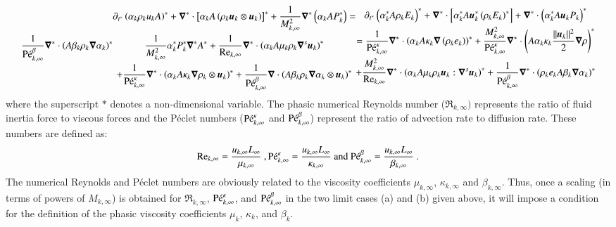 \documentclass[preprint,10pt]{elsarticle}
\begin{document}
\begin{enumerate}
\begin{subequations}
\begin{multline}
\frac{1}{\Pe_{k,\infty}^\beta} \grad^* \cdot \left( A \beta_k \rho_k \grad \alpha_k \right)^*
\end{multline}
%
\begin{multline}\label{eq:sev_equ-with-diss-terms-mom_case_one_scaled}
\partial_{t^*} \left( \alpha_k \rho_k u_k A \right)^* + \grad^* \cdot \left[ \alpha_k A \left( \rho_k \mbold u_k \otimes \mbold u_k\right)\right]^* + \frac{1}{M^2_{k,\infty}}\grad^* \left( \alpha_k A P_k^* \right) = \\
  \frac{1}{M^2_{k,\infty}} \alpha_k^* P^*_k \grad^* A^*  
+ \frac{1}{\Re_{k,\infty}}\grad^* \cdot \left( \alpha_k A \mu_k \rho_k \grad^s \mbold u_k \right)^* \\ 
+ \frac{1}{\Pe_{k,\infty}^\kappa} \grad^* \cdot\left( \alpha_k A \kappa_k \grad \rho_k \otimes \mbold u_k \right)^* 
+ \frac{1}{\Pe_{k,\infty}^\beta} \grad \cdot \left( A \beta_k \rho_k \grad \alpha_k \otimes \mbold u_k \right)^*
\end{multline}
%
\begin{multline}\label{eq:sev_equ-with-diss-terms-ener_case_one_scaled}
\partial_{t^*} \left( \alpha_k^* A \rho_k E_k \right)^* + \grad^* \cdot \left[ \alpha_k^* A \mbold u_k^*  \left( \rho_k E_k \right)^* \right] +  \grad^* \cdot \left(\alpha_k^* A \mbold u_k P_k \right)^*  \\ =
\frac{1}{\Pe_{k,\infty}^\kappa} \grad^* \cdot \left( \alpha_k A \kappa_k \grad \left( \rho_k e_k \right) \right)^* 
+ \frac{M^2_{k,\infty}}{\Pe_{k,\infty}^\kappa} \grad^* \cdot \left( A\alpha_k \kappa_k \frac{||\mbold u_k||^2}{2} \grad \rho \right)^*  \\
+ \frac{M^2_{k,\infty}}{\Re_{k,\infty}} \grad^* \cdot \left( \alpha_k A \mu_k \rho_k \mbold u_k : \grad^s \mbold u_k\right)^* 
+ \frac{1}{\Pe_{k,\infty}^\beta } \grad^*\cdot \left( \rho_k e_k A \beta_k \grad \alpha_k \right)^*
\end{multline}
%
\end{subequations}
%
where the superscript $*$ denotes a non-dimensional variable. The phasic numerical Reynolds number ($\Re_{k,\infty})$ represents the ratio of fluid inertia force to viscous forces and 
the P\'eclet numbers ($\textrm{P\'e}_{k,\infty}^\kappa$ and $\textrm{P\'e}_{k,\infty}^\beta$) represent the ratio of advection rate to diffusion rate. These numbers are defined as:
%
\begin{equation}
\label{eq:ref_numb}
\textrm{Re}_{k,\infty} = \frac{u_{k,\infty} L_\infty}{\mu_{k,\infty}} \ ,
\textrm{P\'e}_{k,\infty}^\kappa = \frac{u_{k,\infty} L_\infty}{\kappa_{k,\infty}} \text{ and }
\textrm{P\'e}_{k,\infty}^\beta = \frac{u_{k,\infty} L_\infty}{\beta_{k,\infty}} \ .
\end{equation}
%
The numerical Reynolds and P\'eclet numbers are obviously related to the 
viscosity coefficients $\mu_{k,\infty}$, $\kappa_{k,\infty}$ and $\beta_{k,\infty}$. Thus, once a scaling (in terms of powers of $M_{k,\infty}$) 
is obtained for $\Re_{k,\infty}$, $\textrm{P\'e}_{k,\infty}^\kappa$, and $\textrm{P\'e}_{k,\infty}^\beta$ in the two limit cases (a) and (b) given above, it will 
impose a condition for the definition of the phasic viscosity coefficients $\mu_k$, $\kappa_k$, and $\beta_k$. 
\end{enumerate} 
\end{document}
